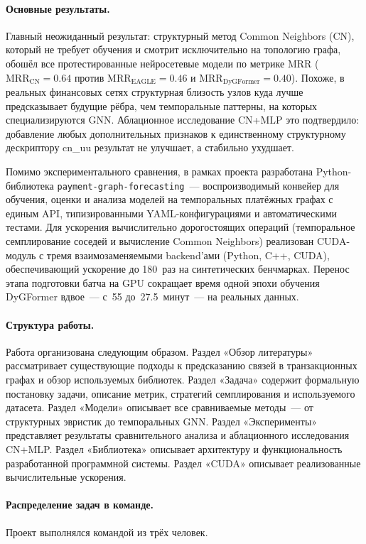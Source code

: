 \documentclass[a4paper,12pt]{extarticle}
\begin{document}
\paragraph{Основные результаты.}
Главный неожиданный результат: структурный метод Common Neighbors (CN), который не требует обучения и смотрит исключительно на топологию графа, обошёл все протестированные нейросетевые модели по метрике MRR ($\text{MRR}_\text{CN} = 0.64$ против $\text{MRR}_\text{EAGLE} = 0.46$ и $\text{MRR}_\text{DyGFormer} = 0.40$). Похоже, в реальных финансовых сетях структурная близость узлов куда лучше предсказывает будущие рёбра, чем темпоральные паттерны, на которых специализируются GNN. Аблационное исследование CN+MLP это подтвердило: добавление любых дополнительных признаков к единственному структурному дескриптору cn\_uu результат не улучшает, а стабильно ухудшает.

Помимо экспериментального сравнения, в рамках проекта разработана Python-библиотека \texttt{payment-graph-forecasting}~--- воспроизводимый конвейер для обучения, оценки и анализа моделей на темпоральных платёжных графах с единым API, типизированными YAML-конфигурациями и автоматическими тестами. Для ускорения вычислительно дорогостоящих операций (темпоральное семплирование соседей и вычисление Common Neighbors) реализован CUDA-модуль с тремя взаимозаменяемыми backend'ами (Python, C++, CUDA), обеспечивающий ускорение до 180~раз на синтетических бенчмарках. Перенос этапа подготовки батча на GPU сокращает время одной эпохи обучения DyGFormer вдвое~--- с~55 до~27.5~минут~--- на реальных данных.

\paragraph{Структура работы.}
Работа организована следующим образом. Раздел «Обзор литературы» рассматривает существующие подходы к предсказанию связей в транзакционных графах и обзор используемых библиотек. Раздел «Задача» содержит формальную постановку задачи, описание метрик, стратегий семплирования и используемого датасета. Раздел «Модели» описывает все сравниваемые методы~--- от структурных эвристик до темпоральных GNN. Раздел «Эксперименты» представляет результаты сравнительного анализа и аблационного исследования CN+MLP. Раздел «Библиотека» описывает архитектуру и функциональность разработанной программной системы. Раздел «CUDA» описывает реализованные вычислительные ускорения.

\paragraph{Распределение задач в команде.}
Проект выполнялся командой из трёх человек.
\end{document}
